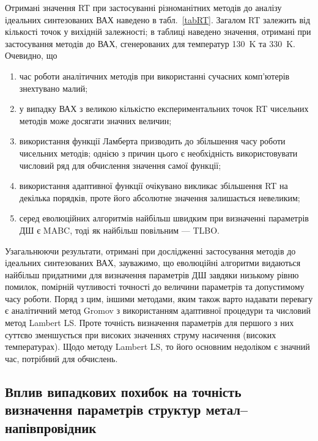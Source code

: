 Отримані значення RT при застосуванні різноманітних методів до аналізу ідеальних синтезованих ВАХ наведено в табл.~\ref{tabRT}.
Загалом RT залежить від кількості точок у вихідній залежності;
в таблиці наведено значення, отримані при застосування методів до ВАХ, сгенерованих для температур 130~K та 330~K.
Очевидно, що
\begin{enumerate}[label=\asbuk*),leftmargin=0em,itemindent=1.5em]
\item час роботи аналітичних методів при використанні сучасних комп'ютерів знехтувано малий;
\item у випадку ВАХ з великою кількістю експериментальних точок RT чисельних методів може досягати значних величин;
\item використання функції Ламберта призводить до збільшення часу роботи чисельних методів; однією з причин цього є необхідність використовувати числовий ряд для обчислення значення самої функції;
\item використання адаптивної функції очікувано викликає збільшення RT на декілька порядків, проте його абсолютне значення залишається невеликим;
\item серед еволюційних алгоритмів найбільш швидким при визначенні параметрів ДШ є MABC, тоді як найбільш повільним --- TLBO.
\end{enumerate}


Узагальнюючи результати, отримані при дослідженні застосування методів до ідеальних синтезованих ВАХ, зауважимо,
що еволюційні алгоритми видаються найбільш придатними для визначення параметрів ДШ завдяки низькому рівню помилок, помірній чутливості точності до величини параметрів
та допустимому часу роботи.
Поряд з цим, іншими методами, яким також варто надавати перевагу є аналітичний метод Gromov з використанням адаптивної процедури та числовий метод Lambert LS.
Проте точність визначення параметрів для першого з них суттєво зменшується при високих значеннях струму насичення (високих температурах).
Щодо методу Lambert LS, то його основним недоліком є значний час, потрібний для обчислень.


\subsection{Вплив випадкових похибок на точність визначення параметрів структур метал--напівпровідник}

